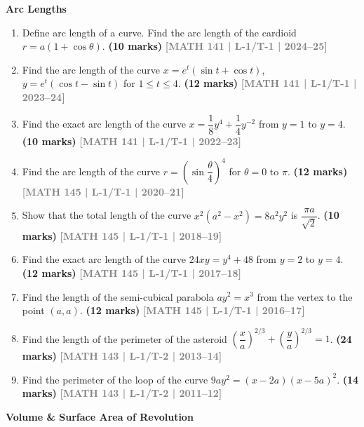 \documentclass[12pt,a3paper]{article}
\newcommand{\yr}[1]{\hfill\textcolor{gray}{\small\textbf{[#1]}}}
\newcommand{\mk}[1]{\textcolor{orange!70!black}{\small\textbf{(#1 marks)}}}
\newcommand{\subtopic}[2]{%
  \vspace{10pt}
  \noindent\begin{tcolorbox}[colback=#1!8,colframe=#1,boxrule=0.6pt,arc=4pt,
    left=6pt,right=6pt,top=4pt,bottom=4pt]
    \small\bfseries\textcolor{#1}{#2}
  \end{tcolorbox}
  \vspace{2pt}
}
\begin{document}
\subtopic{cB}{Arc Lengths}
\label{sub:s2-arclength}

\begin{enumerate}

\item Define arc length of a curve. Find the arc length of the cardioid $r=a(1+\cos\theta)$. 
\mk{10}  \yr{MATH 141 | L-1/T-1 | 2024--25}
  
\item Find the arc length of the curve $x=e^{t}(\sin t+\cos t)$, $y=e^{t}(\cos t-\sin t)$ for $1\le t\le 4$.
\mk{12} \yr{MATH 141 | L-1/T-1 | 2023--24}

\item Find the exact arc length of the curve $x=\dfrac{1}{8}y^{4}+\dfrac{1}{4}y^{-2}$ from $y=1$ to $y=4$.
\mk{10} \yr{MATH 141 | L-1/T-1 | 2022--23}

\item Find the arc length of the curve $r=\left(\sin\dfrac{\theta}{4}\right)^{4}$ for $\theta=0$ to $\pi$.
\mk{12} \yr{MATH 145 | L-1/T-1 | 2020--21}

\item Show that the total length of the curve $x^{2}(a^{2}-x^{2})=8a^{2}y^{2}$ is $\dfrac{\pi a}{\sqrt{2}}$.
\mk{10} \yr{MATH 145 | L-1/T-1 | 2018--19}

\item Find the exact arc length of the curve $24xy=y^{4}+48$ from $y=2$ to $y=4$.
\mk{12} \yr{MATH 145 | L-1/T-1 | 2017--18}

\item Find the length of the semi-cubical parabola $ay^{2}=x^{3}$ from the vertex to the point $(a,a)$.
\mk{12} \yr{MATH 145 | L-1/T-1 | 2016--17}

\item Find the length of the perimeter of the asteroid $\left(\dfrac{x}{a}\right)^{2/3}+\left(\dfrac{y}{a}\right)^{2/3}=1$.
\mk{24\textonehalf} \yr{MATH 143 | L-1/T-2 | 2013--14}

\item Find the perimeter of the loop of the curve $9ay^{2}=(x-2a)(x-5a)^{2}$.
\mk{14\textonehalf} \yr{MATH 143 | L-1/T-2 | 2011--12}

\end{enumerate}

\subtopic{cB}{Volume \& Surface Area of Revolution}
\label{sub:s2-volume}
\end{document}
